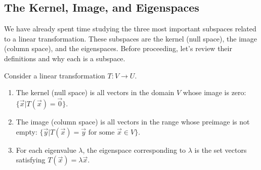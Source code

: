 \subsection{The Kernel, Image, and Eigenspaces}
We have already spent time studying the three most important subspaces related to a linear transformation. These subspaces are the kernel (null space), the image (column space), and the eigenspaces. Before proceeding, let's review their definitions and why each is a subspace.
\begin{definition} Consider a linear transformation $T\colon V\to U$.
\begin{enumerate}
	\item The kernel (null space) is all vectors in the domain $V$ whose image is zero: $\{\vec x | T(\vec x)=\vec 0\}$.
	\item The image (column space) is all vectors in the range whose preimage is not empty: $\{\vec y | T(\vec x)=\vec y \text{ for some }\vec x \in V\}$.
	\item For each eigenvalue $\lambda$, the eigenspace corresponding to $\lambda$ is the set vectors satisfying $T(\vec x) = \lambda\vec x$. 
\end{enumerate}
\end{definition}
